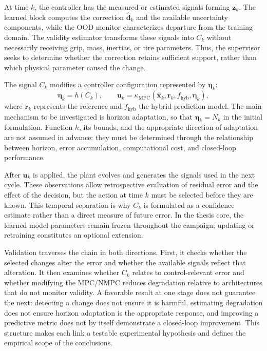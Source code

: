 \documentclass[12pt,a4paper]{report}
\begin{document}
At time $k$, the controller has the measured or estimated signals forming $\mathbf z_k$. The learned block computes the correction $\hat{\mathbf d}_k$ and the available uncertainty components, while the OOD monitor characterizes departure from the training domain. The validity estimator transforms these signals into $C_k$ without necessarily receiving grip, mass, inertias, or tire parameters. Thus, the supervisor seeks to determine whether the correction retains sufficient support, rather than which physical parameter caused the change.

The signal $C_k$ modifies a controller configuration represented by $\boldsymbol{\eta}_k$:
\begin{equation}
    \boldsymbol{\eta}_k=h(C_k),
    \qquad
    \mathbf u_k
    =
    \kappa_{\mathrm{MPC}}
    \!\left(
        \hat{\mathbf x}_k,
        \mathbf r_k,
        f_{\mathrm{hyb}},
        \boldsymbol{\eta}_k
    \right),
    \label{eq:validity_aware_control_law}
\end{equation}
where $\mathbf r_k$ represents the reference and $f_{\mathrm{hyb}}$ the hybrid prediction model. The main mechanism to be investigated is horizon adaptation, so that $\boldsymbol{\eta}_k=N_k$ in the initial formulation. Function $h$, its bounds, and the appropriate direction of adaptation are not assumed in advance: they must be determined through the relationship between horizon, error accumulation, computational cost, and closed-loop performance.

After $\mathbf u_k$ is applied, the plant evolves and generates the signals used in the next cycle. These observations allow retrospective evaluation of residual error and the effect of the decision, but the action at time $k$ must be selected before they are known. This temporal separation is why $C_k$ is formulated as a confidence estimate rather than a direct measure of future error. In the thesis core, the learned model parameters remain frozen throughout the campaign; updating or retraining constitutes an optional extension.

Validation traverses the chain in both directions. First, it checks whether the selected changes alter the error and whether the available signals reflect that alteration. It then examines whether $C_k$ relates to control-relevant error and whether modifying the MPC/NMPC reduces degradation relative to architectures that do not monitor validity. A favorable result at one stage does not guarantee the next: detecting a change does not ensure it is harmful, estimating degradation does not ensure horizon adaptation is the appropriate response, and improving a predictive metric does not by itself demonstrate a closed-loop improvement. This structure makes each link a testable experimental hypothesis and defines the empirical scope of the conclusions.
\end{document}
